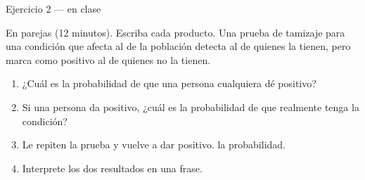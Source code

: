 \documentclass[aspectratio=169,10pt]{beamer}
\begin{document}
\begin{frame}{Ejercicio 2 — en clase}
  \begin{alertblock}{En parejas (12 minutos). Escriba cada producto.}
    \scriptsize
    Una prueba de tamizaje para una condición que afecta al 
    de la población detecta al  de quienes la tienen, pero
    marca como positivo al  de quienes no la tienen.

    \vspace{0.2cm}
    \begin{enumerate}\setlength{\itemsep}{0.02cm}
      \item ¿Cuál es la probabilidad de que una persona cualquiera dé
            positivo?
      \item Si una persona da positivo, ¿cuál es la probabilidad de que
            realmente tenga la condición?
      \item Le repiten la prueba y vuelve a dar positivo.
             la probabilidad.
      \item Interprete los dos resultados en una frase.
    \end{enumerate}
  \end{alertblock}
\end{frame}
\end{document}
